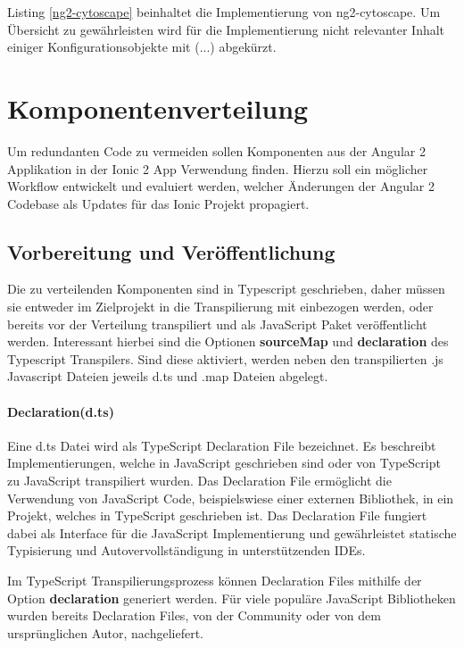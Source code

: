 

Listing \ref{ng2-cytoscape} beinhaltet die Implementierung von ng2-cytoscape.
Um Übersicht zu gewährleisten wird für die Implementierung nicht relevanter Inhalt einiger Konfigurationsobjekte mit (...) abgekürzt.



\section{Komponentenverteilung}

Um redundanten Code zu vermeiden sollen Komponenten aus der Angular 2 Applikation in der Ionic 2 App Verwendung finden.
Hierzu soll ein möglicher Workflow entwickelt und evaluiert werden, welcher Änderungen
der Angular 2 Codebase als Updates für das Ionic Projekt propagiert.

\subsection{Vorbereitung und Veröffentlichung}

Die zu verteilenden Komponenten sind in Typescript geschrieben,
daher müssen sie entweder im Zielprojekt in die Transpilierung mit einbezogen werden,
oder bereits vor der Verteilung transpiliert und als JavaScript Paket veröffentlicht werden.
Interessant hierbei sind die Optionen \textbf{sourceMap} und \textbf{declaration} des Typescript Transpilers.
Sind diese aktiviert, werden neben den transpilierten .js Javascript Dateien jeweils d.ts und .map Dateien abgelegt.

\paragraph{Declaration(d.ts)}

Eine d.ts Datei wird als TypeScript Declaration File bezeichnet.
Es beschreibt Implementierungen, welche in JavaScript geschrieben sind oder von TypeScript zu JavaScript transpiliert wurden.
Das Declaration File ermöglicht die Verwendung von JavaScript Code, beispielswiese einer externen Bibliothek,
in ein Projekt, welches in TypeScript geschrieben ist. Das Declaration File fungiert dabei als Interface
für die JavaScript Implementierung und gewährleistet statische Typisierung
und Autovervollständigung in unterstützenden IDEs.

Im TypeScript Transpilierungsprozess können Declaration Files mithilfe der Option \textbf{declaration} generiert werden.
Für viele populäre JavaScript Bibliotheken wurden bereits Declaration Files, von der Community oder von dem ursprünglichen Autor, nachgeliefert.
\cite[471]{EssentialTS}

